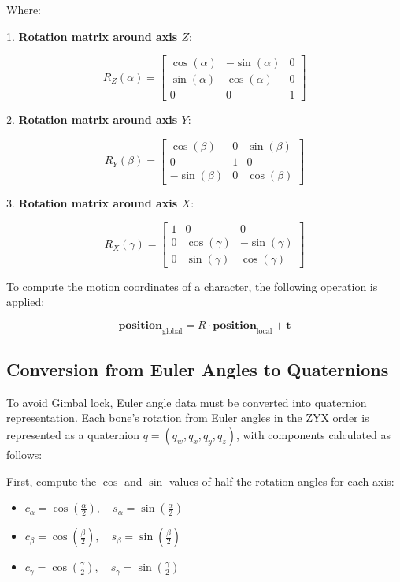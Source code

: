 Where:

1. \textbf{Rotation matrix around axis \(Z\)}:

\[
R_Z(\alpha) = 
\begin{bmatrix}
	\cos(\alpha) & -\sin(\alpha) & 0 \\
	\sin(\alpha) & \cos(\alpha) & 0 \\
	0 & 0 & 1
\end{bmatrix}
\]

2. \textbf{Rotation matrix around axis \(Y\)}:

\[
R_Y(\beta) = 
\begin{bmatrix}
	\cos(\beta) & 0 & \sin(\beta) \\
	0 & 1 & 0 \\
	-\sin(\beta) & 0 & \cos(\beta)
\end{bmatrix}
\]

3. \textbf{Rotation matrix around axis \(X\)}:

\[
R_X(\gamma) = 
\begin{bmatrix}
	1 & 0 & 0 \\
	0 & \cos(\gamma) & -\sin(\gamma) \\
	0 & \sin(\gamma) & \cos(\gamma)
\end{bmatrix}
\]

To compute the motion coordinates of a character, the following operation is applied:

\begin{equation}
	\mathbf{position}_{\text{global}} = R \cdot \mathbf{position}_{\text{local}} + \mathbf{t}
\end{equation}


\subsection{Conversion from Euler Angles to Quaternions}
\label{appendix:BVHData:QuaternionConvert}

To avoid Gimbal lock, Euler angle data must be converted into quaternion representation. Each bone's rotation from Euler angles in the ZYX order is represented as a quaternion $q = (q_w, q_x, q_y, q_z)$, with components calculated as follows:

First, compute the $\cos$ and $\sin$ values of half the rotation angles for each axis:

\begin{itemize}
	\item $c_{\alpha} = \cos\left(\frac{\alpha}{2}\right), \quad s_{\alpha} = \sin\left(\frac{\alpha}{2}\right)$
	\item $c_{\beta} = \cos\left(\frac{\beta}{2}\right), \quad s_{\beta} = \sin\left(\frac{\beta}{2}\right)$
	\item $c_{\gamma} = \cos\left(\frac{\gamma}{2}\right), \quad s_{\gamma} = \sin\left(\frac{\gamma}{2}\right)$
\end{itemize}

